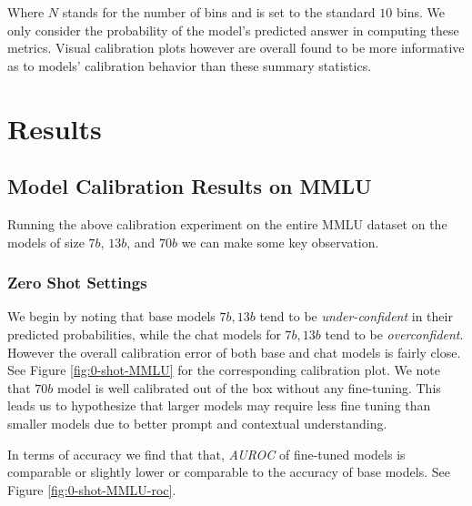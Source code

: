 \documentclass[11pt]{article}
\begin{document}
Where $N$ stands for the number of bins and is set to the standard $10$ bins. We only consider 
the probability of the model's predicted answer in computing these metrics. 
Visual calibration plots however are overall found to be more 
informative as to models' calibration behavior than these summary statistics.

\section{Results}




\subsection{Model Calibration Results on MMLU}

Running the above calibration experiment on the entire 
MMLU dataset on the models of size $7b$, $13b$, and $70b$ 
we can make some key observation. 

\subsubsection{Zero Shot Settings}

We begin by noting that base models $7b, 13b$ tend to be 
\emph{under-confident} in their predicted probabilities, while 
the chat models  for $7b, 13b$ tend to be  \emph{overconfident}.
However the overall calibration error of both base and chat
models is fairly close. See Figure \ref{fig:0-shot-MMLU}  for 
the corresponding calibration plot. We note that $70 b$ model is well 
calibrated out of the box without any fine-tuning. This leads us to 
hypothesize that larger models may require less fine tuning than smaller 
models due to better prompt and contextual understanding.

In terms of accuracy we find that that, \emph{AUROC} 
of fine-tuned models is comparable or slightly lower 
or comparable to the accuracy of base models. See 
Figure \ref{fig:0-shot-MMLU-roc}.
\end{document}
